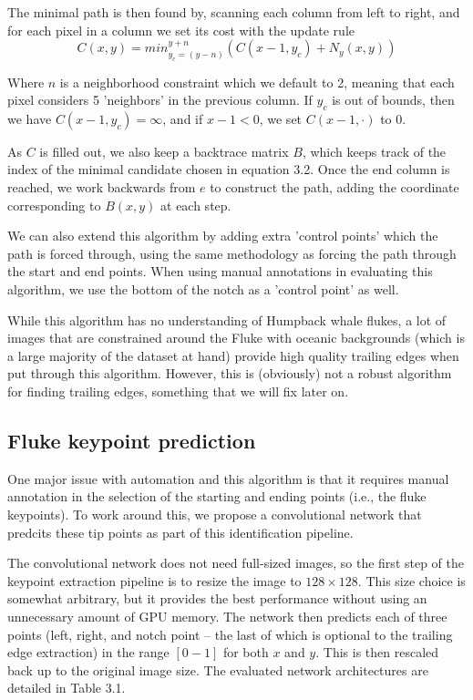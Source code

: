 The minimal path is then found by, scanning each column from left to right, and for each pixel in a column we set its cost with the update rule
\begin{equation} \label{te_update}
C(x,y) = min_{y_c=(y-n)}^{y+n}(C(x-1, y_c) + N_y(x,y))
\end{equation}

Where $n$ is a neighborhood constraint which we default to 2, meaning that each pixel considers 5 'neighbors' in the previous column.
If $y_c$ is out of bounds, then we have $C(x-1, y_c) = \infty$, and if $x - 1 < 0$, we set $C(x-1, \cdot)$ to $0$.

As $C$ is filled out, we also keep a backtrace matrix $B$, which keeps track of the index of the minimal candidate chosen in equation 3.2.
Once the end column is reached, we work backwards from $e$ to construct the path, adding the coordinate corresponding to $B(x,y)$ at each step.


We can also extend this algorithm by adding extra 'control points' which the path is forced through, using the same methodology as forcing the path through the start and end points.
When using manual annotations in evaluating this algorithm, we use the bottom of the notch as a 'control point' as well.

While this algorithm has no understanding of Humpback whale flukes, a lot of images that are constrained around the Fluke with oceanic backgrounds (which is a large majority of the dataset at hand) provide high quality trailing edges when put through this algorithm.
However, this is (obviously) not a robust algorithm for finding trailing edges, something that we will fix later on.

\subsection{Fluke keypoint prediction}

One major issue with automation and this algorithm is that it requires manual annotation in the selection of the starting and ending points (i.e., the fluke keypoints).
To work around this, we propose a convolutional network that predcits these tip points as part of this identification pipeline.

The convolutional network does not need full-sized images, so the first step of the keypoint extraction pipeline is to resize the image to $128 \times 128$.
This size choice is somewhat arbitrary, but it provides the best performance without using an unnecessary amount of GPU memory.
The network then predicts each of three points (left, right, and notch point -- the last of which is optional to the trailing edge extraction) in the range $[0-1]$ for both $x$ and $y$. 
This is then rescaled back up to the original image size.
The evaluated network architectures are detailed in Table 3.1. %

